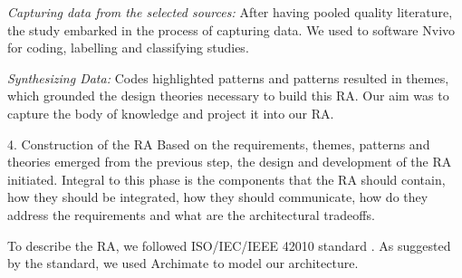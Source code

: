 \documentclass[conference]{IEEEtran}
\begin{document}
\begin{LaTeXdescription}
\emph{Capturing data from the selected sources:} After having pooled quality literature, the study embarked in the process of capturing data. We used to software Nvivo for coding, labelling and classifying studies. 

\emph{Synthesizing Data:} Codes highlighted patterns and patterns resulted in themes, which grounded the design theories necessary to build this RA. Our aim was to capture the body of knowledge and project it into our RA. 


\item[4. Construction of the RA] Based on the requirements, themes, patterns and theories emerged from the previous step, the design and development of the RA initiated. Integral to this phase is the components that the RA should contain, how they should be integrated, how they should communicate, how do they address the requirements and what are the architectural tradeoffs. 

To describe the RA, we followed ISO/IEC/IEEE 42010 standard \cite{ISO42010}. As suggested by the standard, we used Archimate to model our architecture.






\end{LaTeXdescription}
\end{document}

